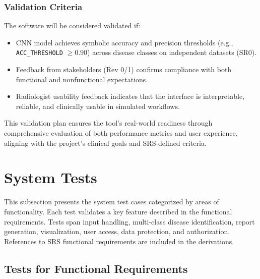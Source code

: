 \documentclass[12pt, titlepage]{article}
\begin{document}
\subsubsection{Validation Criteria}
The software will be considered validated if:
\begin{itemize}
  \item CNN model achieves symbolic accuracy and precision thresholds (e.g., \texttt{ACC\_THRESHOLD} $\geq 0.90$) across disease classes on independent datasets (SR0).
  \item Feedback from stakeholders (Rev 0/1) confirms compliance with both functional and nonfunctional expectations.
  \item Radiologist usability feedback indicates that the interface is interpretable, reliable, and clinically usable in simulated workflows.
\end{itemize}

This validation plan ensures the tool's real-world readiness through comprehensive evaluation of both performance metrics and user experience, aligning with the project's clinical goals and SRS-defined criteria.


\section{System Tests}


\newcommand{\ACCURACYTHRESHOLD}{90\%}  %

This subsection presents the system test cases categorized by areas of functionality. Each test validates a key feature described in the functional requirements. Tests span input handling, multi-class disease identification, report generation, visualization, user access, data protection, and authorization. References to SRS functional requirements are included in the derivations.

\subsection{Tests for Functional Requirements}
\end{document}

